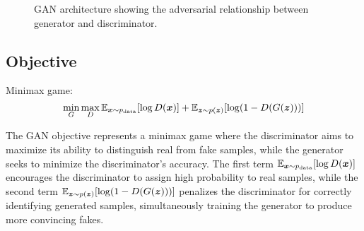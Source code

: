 \begin{figure}[h]
  \centering
\caption{GAN architecture showing the adversarial relationship between generator and discriminator.}
\label{fig:gan-architecture}
\end{figure}

\subsection{Objective}

Minimax game:
\begin{equation}
\min_G \max_D \mathbb{E}_{\boldsymbol{x} \sim p_{\text{data}}}[\log D(\boldsymbol{x})] + \mathbb{E}_{\boldsymbol{z} \sim p(\boldsymbol{z})}[\log(1 - D(G(\boldsymbol{z})))]
\end{equation}

The GAN objective represents a minimax game where the discriminator aims to maximize its ability to distinguish real from fake samples, while the generator seeks to minimize the discriminator's accuracy. The first term $\mathbb{E}_{\boldsymbol{x} \sim p_{\text{data}}}[\log D(\boldsymbol{x})]$ encourages the discriminator to assign high probability to real samples, while the second term $\mathbb{E}_{\boldsymbol{z} \sim p(\boldsymbol{z})}[\log(1 - D(G(\boldsymbol{z})))]$ penalizes the discriminator for correctly identifying generated samples, simultaneously training the generator to produce more convincing fakes.

